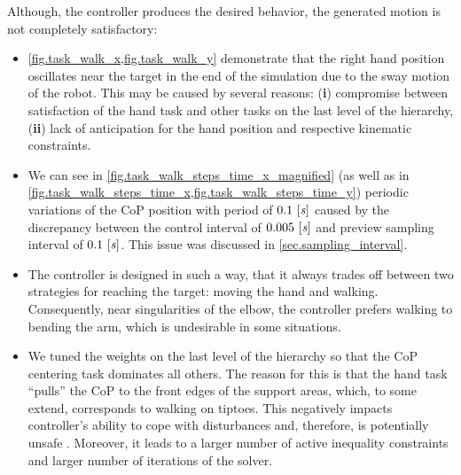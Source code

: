Although, the controller produces the desired behavior, the generated motion is
not completely satisfactory:
%
\begin{itemize}
    \item \cref{fig.task_walk_x,fig.task_walk_y} demonstrate that the right
        hand position oscillates near the target in the end of the simulation
        due to the sway motion of the robot. This may be caused by several
        reasons: ({\bf i}) compromise between satisfaction of the hand task and
        other tasks on the last level of the hierarchy, ({\bf ii}) lack of
        anticipation for the hand position and respective kinematic
        constraints.

    \item We can see in \cref{fig.task_walk_steps_time_x_magnified} (as well as
        in \cref{fig.task_walk_steps_time_x,fig.task_walk_steps_time_y})
        periodic variations of the \ac{CoP} position with period of
        $0.1~[\mathit{s}]$ caused by the discrepancy between the control interval
        of $0.005~[\mathit{s}]$ and preview sampling interval of $0.1~[\mathit{s}]$.
        This issue was discussed in \cref{sec.sampling_interval}.

\begin{figure}[!htbp]
\end{figure}

    \item The controller is designed in such a way, that it always trades off
        between two strategies for reaching the target: moving the hand and
        walking. Consequently, near singularities of the elbow, the controller
        prefers walking to bending the arm, which is undesirable in some
        situations.

    \item We tuned the weights on the last level of the hierarchy so that the
        \ac{CoP} centering task dominates all others. The reason for this is
        that the hand task ``pulls'' the \ac{CoP} to the front edges of the
        support areas, which, to some extend, corresponds to walking on
        tiptoes. This negatively impacts controller's ability to cope with
        disturbances and, therefore, is potentially unsafe
        \cite{Lafaye2014humanoids}. Moreover, it leads to a larger number of
        active inequality constraints and larger number of iterations of the
        solver.
\end{itemize}



